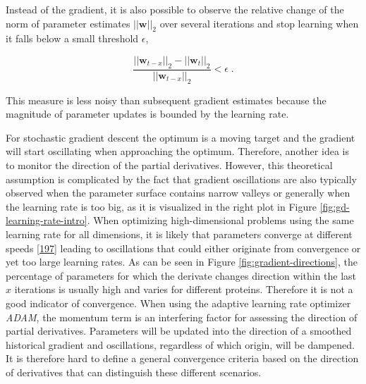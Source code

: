 \documentclass[11pt,a4paper,twoside]{book}
\newcommand{\w}{\mathbf{w}}
\theoremstyle{definition}
\theoremstyle{definition}
\theoremstyle{remark}
\begin{document}
Instead of the gradient, it is also possible to observe the relative
change of the norm of parameter estimates \(||\w||_2\) over several
iterations and stop learning when it falls below a small threshold
\(\epsilon\),

\begin{equation}
  \frac{||\w_{t-x}||_2 - ||\w_t||_2}{||\w_{t-x}||_2} < \epsilon \; .
  \label{eq:parameter-convergence-criterion}
\end{equation}

This measure is less noisy than subsequent gradient estimates because
the magnitude of parameter updates is bounded by the learning rate.

For stochastic gradient descent the optimum is a moving target and the
gradient will start oscillating when approaching the optimum. Therefore,
another idea is to monitor the direction of the partial derivatives.
However, this theoretical assumption is complicated by the fact that
gradient oscillations are also typically observed when the parameter
surface contains narrow valleys or generally when the learning rate is
too big, as it is visualized in the right plot in Figure
\ref{fig:gd-learning-rate-intro}. When optimizing high-dimensional
problems using the same learning rate for all dimensions, it is likely
that parameters converge at different speeds
{[}\protect\hyperlink{ref-Ruder2017}{197}{]} leading to oscillations
that could either originate from convergence or yet too large learning
rates. As can be seen in Figure \ref{fig:gradient-directions}, the
percentage of parameters for which the derivate changes direction within
the last \(x\) iterations is usually high and varies for different
proteins. Therefore it is not a good indicator of convergence. When
using the adaptive learning rate optimizer \emph{ADAM}, the momentum
term is an interfering factor for assessing the direction of partial
derivatives. Parameters will be updated into the direction of a smoothed
historical gradient and oscillations, regardless of which origin, will
be dampened. It is therefore hard to define a general convergence
criteria based on the direction of derivatives that can distinguish
these different scenarios.
\end{document}
